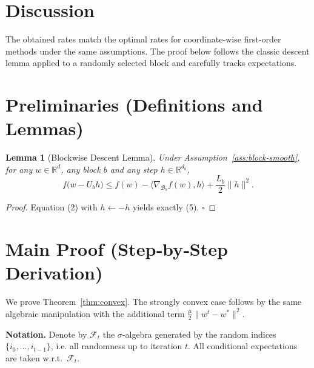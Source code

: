 \documentclass{article}
\newtheorem{lemma}{Lemma}
\newcommand{\R}{\mathbb{R}}
\begin{document}
\section*{Discussion}
The obtained rates match the optimal rates for coordinate‑wise first‑order methods
under the same assumptions.  The proof below follows the classic descent lemma
applied to a randomly selected block and carefully tracks expectations.

\newpage
\section*{Preliminaries (Definitions and Lemmas)}
\begin{lemma}[Blockwise Descent Lemma]\label{lem:descent}
Under Assumption~\ref{ass:block-smooth}, for any $w\in\R^{d}$, any block $b$ and any
step $h\in\R^{d_{b}}$,
\[
f\!\bigl(w-U_{b}h\bigr)\le
f(w)-\langle\nabla_{\mathcal{B}_{b}}f(w),h\rangle+\frac{L_{b}}{2}\|h\|^{2}.
\tag{5}
\]
\end{lemma}
\begin{proof}
Equation (2) with $h\leftarrow -h$ yields exactly (5). \hfill $\square$
\end{proof}

\section*{Main Proof (Step‑by‑Step Derivation)}
We prove Theorem~\ref{thm:convex}.  The strongly convex case follows by the same
algebraic manipulation with the additional term $\frac{\mu}{2}\|w^{t}-w^{*}\|^{2}$.

\noindent\textbf{Notation.}
Denote by $\mathcal{F}_{t}$ the $\sigma$‑algebra generated by the random
indices $\{i_{0},\dots ,i_{t-1}\}$, i.e. all randomness up to iteration $t$.
All conditional expectations are taken w.r.t.\ $\mathcal{F}_{t}$.
\end{document}
